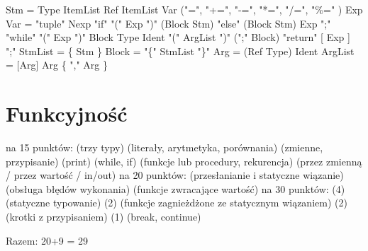 \documentclass{article}
\begin{document}
Stm \; = \; 
Type ItemList \;\textbar\; 
Ref ItemList \;\textbar\; \newline
Var ("=", "+=", "-=", "*=", "/=", "\%=" ) Exp \;\textbar\;  Var = "tuple" Nexp \;\textbar\; \newline
"if" "(" Exp ")" (Block \textbar Stm) "else" (Block \textbar Stm) \textbar Exp ";" \;\textbar\;\newline
"while" "(" Exp ")" Block \;\textbar\; \newline
Type Ident "(" ArgList ")" (";" \textbar Block) \;\textbar\; 
"return" [ Exp ] ";" \newline
StmList \; = \;\{ Stm \} \newline
Block\; = \; "\{" StmList "\}" \newline
Arg \; = \; (Ref \textbar Type)  Ident \newline
ArgList \; =  [Arg] \;\textbar\; Arg \{ "," Arg \}  \newline

\section{Funkcyjność} 
  na 15 punktów: (trzy typy)  (literały, arytmetyka, porównania)  (zmienne, przypisanie) (print) (while, if) (funkcje lub procedury, rekurencja) (przez zmienną / przez wartość / in/out)\newline
  na 20 punktów: (przesłanianie i statyczne wiązanie) (obsługa błędów wykonania) (funkcje zwracające wartość)\newline
  na 30 punktów: (4) (statyczne typowanie) (2) (funkcje zagnieżdżone ze statycznym wiązaniem) (2) (krotki z przypisaniem) (1) (break, continue)\newline

Razem: 20+9 = 29
\end{document}
